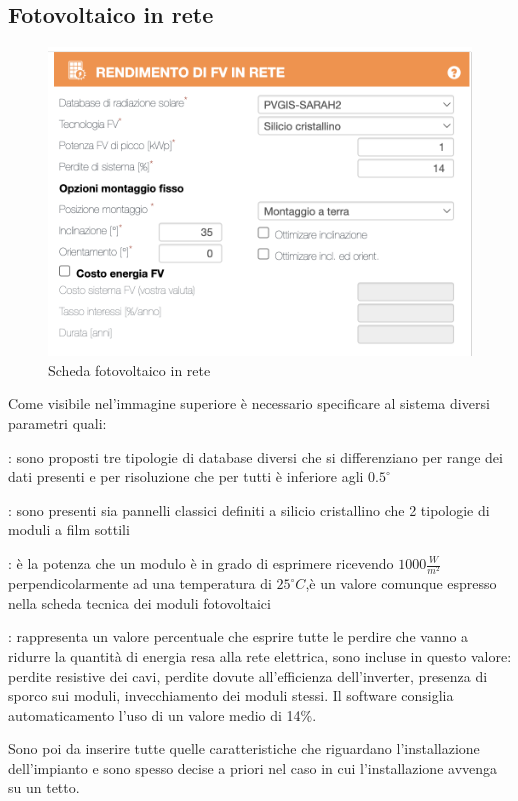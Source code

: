\subsection{Fotovoltaico in rete}
\begin{figure}[H]
    \centering
    \includegraphics[height=0.5\textwidth]{res/cap 4/Fotovoltaico statico}
    \caption{Scheda fotovoltaico in rete}
\end{figure}\noindent
Come visibile nel'immagine superiore è necessario specificare al sistema diversi parametri quali:
\begin{description}[labelindent=5mm]
    \item[$\bullet$ Database di radiazione solare]: sono proposti tre tipologie di database diversi che si differenziano per range dei dati presenti e per risoluzione che per tutti è inferiore agli \large{$0.5^{\circ}$}
    \item[$\bullet$ Tecnologia fotovoltaico]: sono presenti sia pannelli classici definiti a silicio cristallino che 2 tipologie di moduli a film sottili
    \item[$\bullet$ Potenza di picco]: è la potenza che un modulo è in grado di esprimere ricevendo \large{$1000\frac{W}{m^2}$} perpendicolarmente ad una temperatura di \large{$25^{\circ}C$},è un valore comunque espresso nella scheda tecnica dei moduli fotovoltaici
    \item[$\bullet$ Perdite di sistema]: rappresenta un valore percentuale che esprire tutte le perdire che vanno a ridurre la quantità di energia resa alla rete elettrica, sono incluse in questo valore: perdite resistive dei cavi, perdite dovute all'efficienza dell'inverter, presenza di sporco sui moduli, invecchiamento dei moduli stessi. Il software consiglia automaticamento l'uso di un valore medio di 14\%.
\end{description}
Sono poi da inserire tutte quelle caratteristiche che riguardano l'installazione dell'impianto e sono spesso decise a priori nel caso in cui l'installazione avvenga su un tetto.
